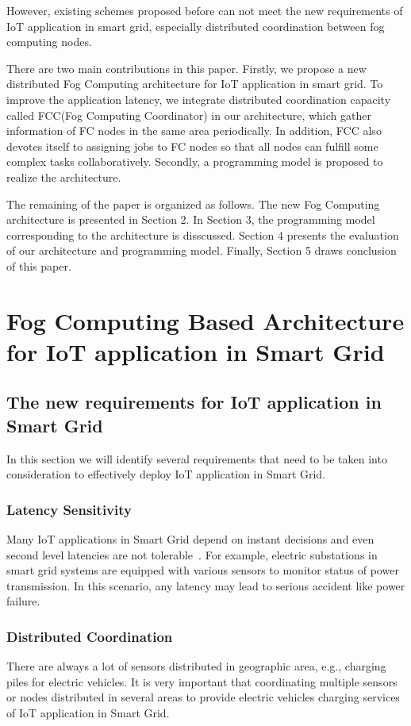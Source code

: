 \documentclass[conference]{IEEEtran}
\begin{document}
However, existing schemes proposed before can not meet the new requirements of IoT application in smart grid, especially distributed coordination between fog computing nodes.

There are two main contributions in this paper. Firstly, we propose a new distributed Fog Computing architecture for IoT application in smart grid. To improve the application latency, we integrate distributed coordination capacity called FCC(Fog Computing Coordinator) in our architecture, which gather information of FC nodes in the same area periodically. In addition, FCC also devotes itself to assigning jobs to FC nodes so that all nodes can fulfill some complex tasks collaboratively. Secondly, a programming model is proposed to realize the architecture. 

The remaining of the paper is organized as follows. The new Fog Computing architecture is presented in Section 2. In Section 3, the programming model corresponding to the architecture is disscussed. Section 4 presents the evaluation of our architecture and programming model. Finally, Section 5 draws conclusion of this paper.

\section{Fog Computing Based Architecture for IoT application in Smart Grid}
\subsection{The new requirements for IoT application in Smart Grid}
In this section we will identify several requirements that
need to be taken into consideration to effectively deploy IoT
application in Smart Grid.
\subsubsection{Latency Sensitivity} Many IoT applications in Smart Grid  depend on instant decisions and even second level latencies are not tolerable~\cite{Chen2017}. For example, electric substations in smart grid systems are equipped with various sensors to monitor status of power transmission. In this scenario, any latency may lead to serious accident like power failure.
\subsubsection{Distributed Coordination} There are always a lot of sensors distributed in geographic area, e.g., charging piles for electric vehicles. It is very important that coordinating multiple sensors or nodes distributed in several areas to provide electric vehicles charging services of IoT application in Smart Grid. 
\end{document}
